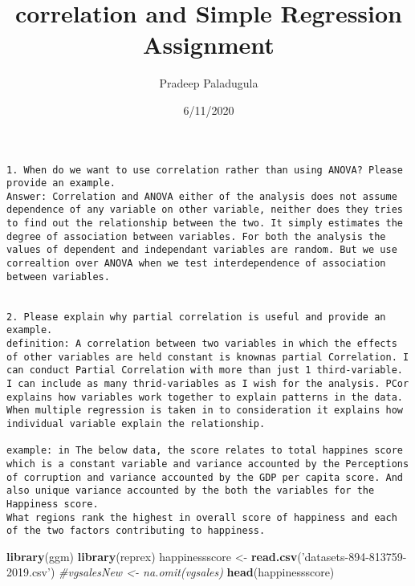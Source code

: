\documentclass[]{article}
\title{correlation and Simple Regression Assignment}
\author{Pradeep Paladugula}
\date{6/11/2020}
\newenvironment{Shaded}{\begin{snugshade}}{\end{snugshade}}
\newcommand{\CommentTok}[1]{\textcolor[rgb]{0.56,0.35,0.01}{\textit{#1}}}
\newcommand{\KeywordTok}[1]{\textcolor[rgb]{0.13,0.29,0.53}{\textbf{#1}}}
\newcommand{\NormalTok}[1]{#1}
\newcommand{\StringTok}[1]{\textcolor[rgb]{0.31,0.60,0.02}{#1}}
\begin{document}
\maketitle

\begin{verbatim}
1. When do we want to use correlation rather than using ANOVA? Please provide an example.
Answer: Correlation and ANOVA either of the analysis does not assume dependence of any variable on other variable, neither does they tries to find out the relationship between the two. It simply estimates the degree of association between variables. For both the analysis the values of dependent and independant variables are random. But we use correaltion over ANOVA when we test interdependence of association between variables. 


2. Please explain why partial correlation is useful and provide an example.
definition: A correlation between two variables in which the effects of other variables are held constant is knownas partial Correlation. I can conduct Partial Correlation with more than just 1 third-variable. I can include as many thrid-variables as I wish for the analysis. PCor explains how variables work together to explain patterns in the data. When multiple regression is taken in to consideration it explains how individual variable explain the relationship.

example: in The below data, the score relates to total happines score which is a constant variable and variance accounted by the Perceptions of corruption and variance accounted by the GDP per capita score. And also unique variance accounted by the both the variables for the Happiness score.
What regions rank the highest in overall score of happiness and each of the two factors contributing to happiness.
\end{verbatim}

\begin{Shaded}
\begin{Highlighting}[]
\KeywordTok{library}\NormalTok{(ggm)}
\KeywordTok{library}\NormalTok{(reprex)}
\NormalTok{happinessscore <-}\StringTok{ }\KeywordTok{read.csv}\NormalTok{(}\StringTok{'datasets-894-813759-2019.csv'}\NormalTok{)}
\CommentTok{#vgsalesNew <- na.omit(vgsales)}
\KeywordTok{head}\NormalTok{(happinessscore)}
\end{Highlighting}
\end{Shaded}
\end{document}
